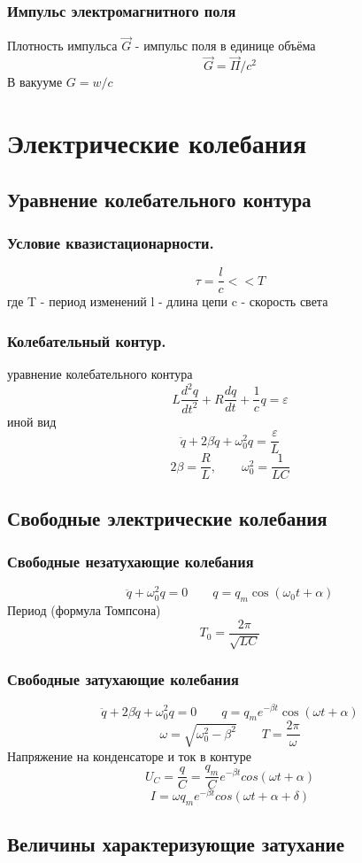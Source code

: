 \documentclass{article}
\begin{document}
\subsubsection{Импульс электромагнитного поля}
Плотность импульса $\vec{G}$ - импульс поля в единице объёма
\[\vec{G}=\vec{\Pi}/c^2\]
В вакууме $G=w/c$
\section{Электрические колебания}
\subsection{Уравнение колебательного контура}
\subsubsection{
    Условие квазистационарности.
}
\[ \tau=\frac{l}{c} << T\]
где T - период изменений 
l - длина цепи 
c - скорость света
\subsubsection{
    Колебательный контур.
}
уравнение колебательного контура
\[L\frac{d^2q}{dt^2}+R\frac{dq}{dt} + \frac{1}{c}q = \varepsilon\] 
иной вид
\[\ddot{q} + 2\beta\dot{q} + \omega_0^2q = \frac{\varepsilon}{L}\]
\[2\beta = \frac{R}{L}, \qquad \omega_0^2 = \frac{1}{LC} \]
\subsection{
    Свободные электрические колебания
}
\subsubsection{
    Свободные незатухающие колебания
}
\[\ddot{q} + \omega_0^2q = 0 \qquad q= q_m\cos(\omega_0t + \alpha)\]
Период (формула Томпсона)
\[T_0 = \frac{2\pi}{\sqrt{LC}}\]
\subsubsection{
    Свободные затухающие колебания
}
\[\ddot{q} + 2\beta\dot{q} + \omega_0^2q = 0 \qquad q= q_m e^{-\beta t} \cos(\omega t + \alpha)\]
\[\omega = \sqrt{\omega_0^2 - \beta^2} \qquad T = \frac{2\pi}{\omega}\]
Напряжение на конденсаторе и ток в контуре
\[U_C = \frac{q}{C} = \frac{q_m}{C}e^{-\beta t}cos(\omega t + \alpha)\]
\[I = \omega q_m e ^ {-\beta t} cos(\omega t + \alpha + \delta)\]
\subsection{
    Величины характеризующие затухание
}
\end{document}
